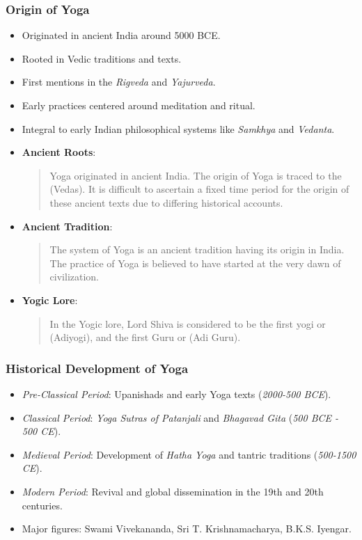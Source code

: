 \begin{frame}[fragile]\frametitle{Origin of Yoga}

      \begin{itemize}
		\item Originated in ancient India around 5000 BCE.
		\item Rooted in Vedic traditions and texts.
		\item First mentions in the \textit{Rigveda} and \textit{Yajurveda}.
		\item Early practices centered around meditation and ritual.
		\item Integral to early Indian philosophical systems like \textit{Samkhya} and \textit{Vedanta}.
        \item \textbf{Ancient Roots}: 
          \begin{quote}
          Yoga originated in ancient India. The origin of Yoga is traced to the  (Vedas). It is difficult to ascertain a fixed time period for the origin of these ancient texts due to differing historical accounts.
          \end{quote}
        \item \textbf{Ancient Tradition}: 
          \begin{quote}
          The system of Yoga is an ancient tradition having its origin in India. The practice of Yoga is believed to have started at the very dawn of civilization.
          \end{quote}
        \item \textbf{Yogic Lore}: 
          \begin{quote}
          In the Yogic lore, Lord Shiva is considered to be the first yogi or  (Adiyogi), and the first Guru or  (Adi Guru).
          \end{quote}		
	  \end{itemize}

\end{frame}

\begin{frame}[fragile]\frametitle{Historical Development of Yoga}

      \begin{itemize}
		\item \textit{Pre-Classical Period}: Upanishads and early Yoga texts (\textit{2000-500 BCE}).
		\item \textit{Classical Period}: \textit{Yoga Sutras of Patanjali} and \textit{Bhagavad Gita} (\textit{500 BCE - 500 CE}).
		\item \textit{Medieval Period}: Development of \textit{Hatha Yoga} and tantric traditions (\textit{500-1500 CE}).
		\item \textit{Modern Period}: Revival and global dissemination in the 19th and 20th centuries.
		\item Major figures: Swami Vivekananda, Sri T. Krishnamacharya, B.K.S. Iyengar.
	  \end{itemize}

\end{frame}

